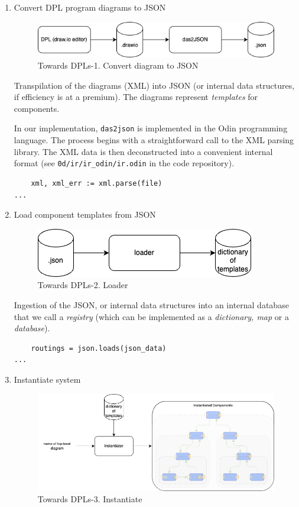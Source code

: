 \documentclass[10pt]{acmart}
\begin{document}
\begin{enumerate}
\item Convert DPL program diagrams to JSON

  \begin{figure}[h]
    \centering
    \includegraphics[width=0.8\linewidth]{./media/image2.png}
    \caption{Towards DPLs-1. Convert diagram to JSON}
    \label{fig:convert_to_json}
  \end{figure}

  Transpilation of the diagrams (XML) into JSON (or internal data structures, if efficiency is at a premium). The diagrams represent \emph{templates} for components.
  
  In our implementation, \texttt{das2json} is implemented\cite{d2jrepo} in the Odin programming language. The process begins with a straightforward call to the XML parsing library. The XML data is then deconstructed into a convenient internal format (see \texttt{0d/ir/ir\_odin/ir.odin} in the code repository).

\begin{verbatim}
    xml, xml_err := xml.parse(file)
...
\end{verbatim}
  
\item Load component templates from JSON

  \begin{figure}[h]
    \centering
    \includegraphics[width=0.6\linewidth]{./media/image3.png}
    \caption{Towards DPLs-2. Loader}
    \label{fig:load_templates}
  \end{figure}

  Ingestion of the JSON, or internal data structures into an internal database that we call a \emph{registry} (which can be implemented as a \emph{dictionary, map} or a \emph{database}).

\begin{verbatim}
    routings = json.loads(json_data)
...
\end{verbatim}

\item Instantiate system
  \begin{figure}[h]
    \centering
    \includegraphics[width=0.8\linewidth]{./media/image4.png}
    \caption{Towards DPLs-3. Instantiate}
    \label{fig:instantiate_system}
  \end{figure}


\end{enumerate}
\end{document}
